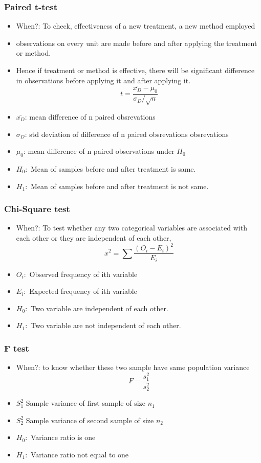 \begin{frame}[fragile]\frametitle{Paired t-test}
\begin{itemize}
\item When?: To check, effectiveness of a new treatment, a new method 
employed 
\item  observations on  every  unit  are  made  before  and  after  applying  the  treatment  or 
method.  
\item Hence  if  treatment  or  method  is  effective,  there  will  be 
significant  difference  in  observations  before  applying  it  and  after 
applying it. 
$$
t = \frac{\bar{x_D} - \mu_0}{\sigma_D /\sqrt{n}}
$$
\item $\bar{x_D}$: mean difference of n paired obsrevations
\item $\sigma_D$:  std deviation of difference of n paired obsrevations obsrevations
\item $\mu_0$: mean difference of n paired observations under $H_0$
\item $H_0: $ Mean of samples before and after treatment is same. 
\item $H_1:$ Mean of samples before and after treatment is not same.
\end{itemize}
\end{frame}


\begin{frame}[fragile]\frametitle{Chi-Square test}
\begin{itemize}
\item When?: To test whether any 
two  categorical variables  are  associated  with  each  other  or  they  are 
independent  of  each  other,
$$
x^2= \sum \frac{(O_i - E_i)^2}{E_i}
$$
\item $O_i:$ Observed frequency of ith variable
\item $E_i:$ Expected frequency of ith variable
\item $H_0: $ Two variable are independent of each other.
\item $H_1:$ Two variable are not independent of each other.
\end{itemize}
\end{frame}

\begin{frame}[fragile]\frametitle{F test}
\begin{itemize}
\item When?: to  know
whether  these  two  sample  have  same  population  variance
$$
F = \frac{s_1^2}{s_2^2}
$$
\item $S_1^2$ Sample variance of first sample of size $n_1$
\item $S_2^2$ Sample variance of second sample of size $n_2$
\item $H_0: $ Variance ratio is one
\item $H_1:$ Variance ratio not equal to one
\end{itemize}
\end{frame}

